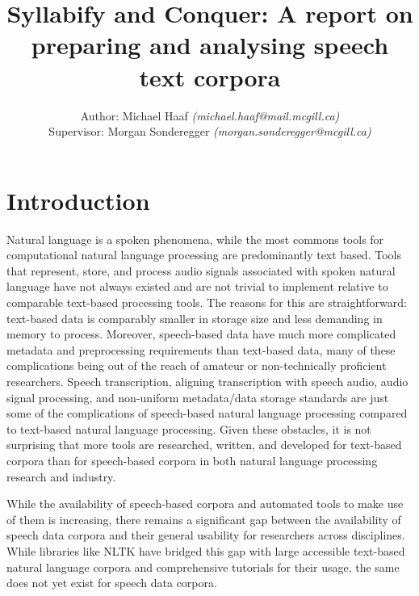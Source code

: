 \documentclass[11pt]{article}
\begin{document}
\title{Syllabify and Conquer: A report on preparing and analysing speech text corpora}
\author{Author: Michael Haaf \textit{(michael.haaf@mail.mcgill.ca)} \\ Supervisor: Morgan Sonderegger \textit{(morgan.sonderegger@mcgill.ca)}}

\maketitle
\begin{singlespace}
\tableofcontents
\end{singlespace}
\newpage

\section{Introduction}

\nocite{*}

Natural language is a spoken phenomena, while the most commons tools for computational natural language processing are predominantly text based. Tools that represent, store, and process audio signals associated with spoken natural language have not always existed and are not trivial to implement relative to comparable text-based processing tools. The reasons for this are straightforward: text-based data is comparably smaller in storage size and less demanding in memory to process. Moreover, speech-based data have much more complicated metadata and preprocessing requirements than text-based data, many of these complications being out of the reach of amateur or non-technically proficient researchers. Speech transcription, aligning transcription with speech audio, audio signal processing, and non-uniform metadata/data storage standards are just some of the complications of speech-based natural language processing compared to text-based natural language processing. Given these obstacles, it is not surprising that more tools are researched, written, and developed for text-based corpora than for speech-based corpora in both natural language processing research and industry.

While the availability of speech-based corpora and automated tools to make use of them is increasing\cite{mcauliffe_polyglot_2017}, there remains a significant gap between the availability of speech data corpora and their general usability for researchers across disciplines. While libraries like NLTK\cite{noauthor_nltk_nodate} have bridged this gap with large accessible text-based natural language corpora and comprehensive tutorials for their usage, the same does not yet exist for speech data corpora.
\end{document}
